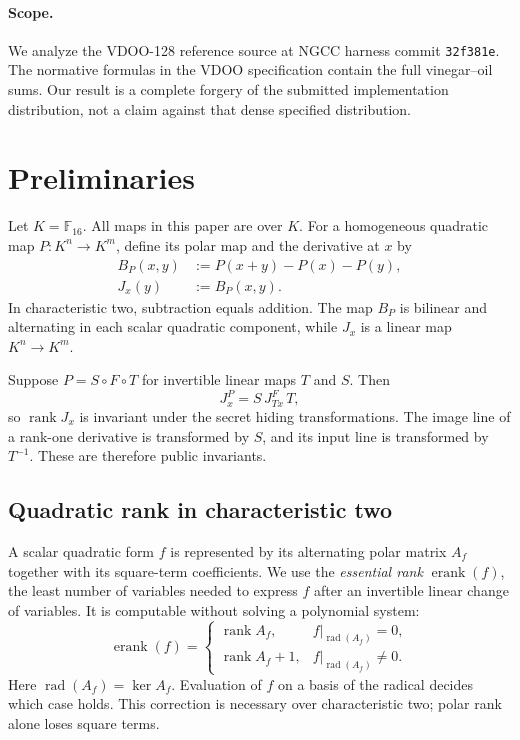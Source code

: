 \documentclass[11pt]{article}
\newcommand{\F}{\mathbb{F}}
\newcommand{\rank}{\operatorname{rank}}
\newcommand{\rad}{\operatorname{rad}}
\newcommand{\essrank}{\operatorname{erank}}
\newcommand{\defeq}{\mathrel{:=}}
\newcommand{\code}[1]{\texttt{#1}}
\begin{document}
\paragraph{Scope.}
We analyze the VDOO-128 reference source at NGCC harness commit
\code{32f381e}.  The normative formulas in
the VDOO specification contain the full vinegar--oil sums.  Our result is a
complete forgery of the submitted implementation distribution, not a claim
against that dense specified distribution.

\section{Preliminaries}

Let $K=\F_{16}$.  All maps in this paper are over $K$.  For a homogeneous
quadratic map $P:K^n\to K^m$, define its polar map and the derivative at $x$ by
\begin{align*}
 B_P(x,y) &\defeq P(x+y)-P(x)-P(y),\\
 J_x(y)   &\defeq B_P(x,y).
\end{align*}
In characteristic two, subtraction equals addition.  The map $B_P$ is
bilinear and alternating in each scalar quadratic component, while $J_x$ is a
linear map $K^n\to K^m$.

Suppose $P=S\circ F\circ T$ for invertible linear maps $T$ and $S$.  Then
\[
       J_x^P=S\,J_{Tx}^F\,T,
\]
so $\rank J_x$ is invariant under the secret hiding transformations.  The
image line of a rank-one derivative is transformed by $S$, and its input line
is transformed by $T^{-1}$.  These are therefore public invariants.

\subsection{Quadratic rank in characteristic two}

A scalar quadratic form $f$ is represented by its alternating polar matrix
$A_f$ together with its square-term coefficients.  We use the \emph{essential
rank} $\essrank(f)$, the least number of variables needed to express $f$ after
an invertible linear change of variables.  It is computable without solving a
polynomial system:
\[
 \essrank(f)=
 \begin{cases}
   \rank A_f,   & f|_{\rad(A_f)}=0,\\
   \rank A_f+1, & f|_{\rad(A_f)}\neq0.
 \end{cases}
\]
Here $\rad(A_f)=\ker A_f$.  Evaluation of $f$ on a basis of the radical
decides which case holds.  This correction is necessary over characteristic
two; polar rank alone loses square terms.
\end{document}
